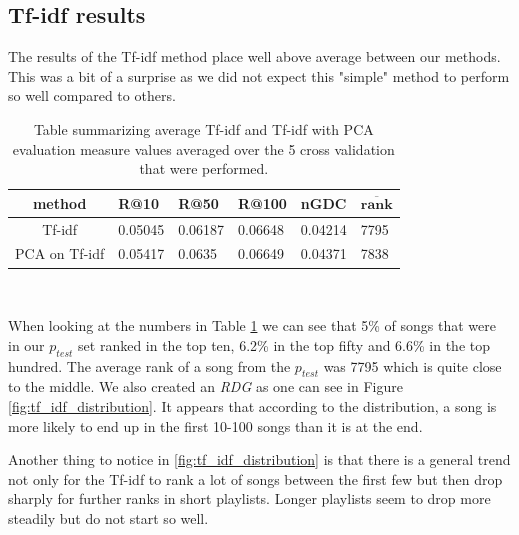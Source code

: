 \subsection{Tf-idf results}\label{ssec:tf_idf_results}

The results of the Tf-idf method place well above average between our methods. This was a bit of a surprise as we did not expect this "simple" method to perform so well compared to others. 

\begin{table}[h]
\centering
\renewcommand{\arraystretch}{1.5}
\begin{tabu} to 1\textwidth {| c || X[c] | X[c] | X[c] | X[c] | X[c] | }
 \hline
 \textbf{method} & \textbf{R@10} & \textbf{R@50} & \textbf{R@100} & \textbf{nGDC} & $ \boldsymbol{\overline{rank}} $ \\
 \hline
 \hline
 Tf-idf & 0.05045 & 0.06187 & 0.06648 & 0.04214 & 7795 \\
 \hline
 PCA on Tf-idf & 0.05417 & 0.0635 & 0.06649 & 0.04371 & 7838 \\
 \hline
\end{tabu} \\
\caption{Table summarizing average Tf-idf and Tf-idf with PCA evaluation measure values averaged over the 5 cross validation that were performed.}
\label{table:1}
\end{table}

When looking at the numbers in Table \ref{table:1} we can see that 5\% of songs that were in our $p_{test}$ set ranked in the top ten, 6.2\% in the top fifty and 6.6\% in the top hundred. The average rank of a song from the $p_{test}$ was 7795 which is quite close to the middle. We also created an \textit{RDG} as one can see in Figure \ref{fig:tf_idf_distribution}. It appears that according to the distribution, a song is more likely to end up in the first 10-100 songs than it is at the end.

Another thing to notice in \ref{fig:tf_idf_distribution} is that there is a general trend not only for the Tf-idf to rank a lot of songs between the first few but then drop sharply for further ranks in short playlists. Longer playlists seem to drop more steadily but do not start so well.

